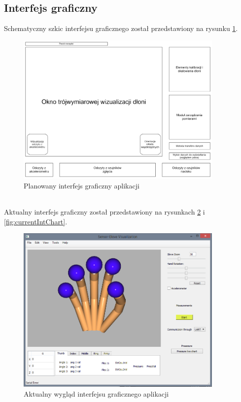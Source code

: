 \documentclass[10pt,a4paper]{article}
\begin{document}
\subsection{Interfejs graficzny}
Schematyczny szkic interfejsu graficznego został przedstawiony na rysunku \ref{fig:interface}.
\begin{figure}[!htb]
\centering
\includegraphics[width=0.9\textwidth]{./WDS_schemat_ideowy_okna_programu.png}
\caption{Planowany interfejs graficzny aplikacji\label{fig:interface}}
\end{figure}\\
\newpage
Aktualny interfejs graficzny został przedstawiony na rysunkach \ref{fig:currentInt} i \ref{fig:currentIntChart}.
\begin{figure}[!htb]
\centering
\includegraphics[width=0.9\textwidth]{./AktualnyInterfejsGraficzny.png}
\caption{Aktualny wygląd interfejsu graficznego aplikacji\label{fig:currentInt}}
\end{figure}
\end{document}
